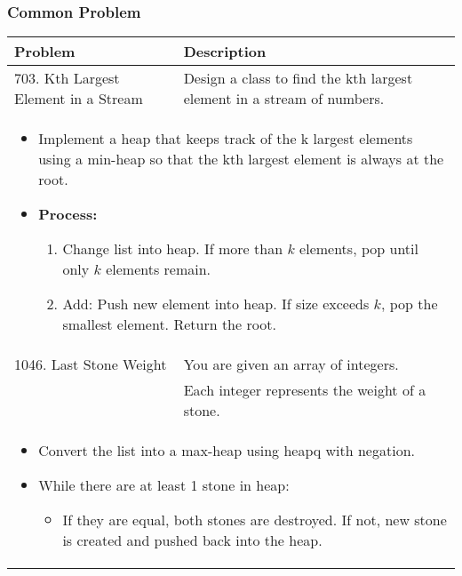 \subsubsection{Common Problem}
\begin{summary}
    \begin{center}
        \begin{tabular}{ll}
            \toprule
            \textbf{Problem} & \textbf{Description} \\
            \midrule
            703. Kth Largest Element in a Stream & Design a class to find the kth largest element in a stream of numbers. \\
            \multicolumn{2}{p{\linewidth}}{
                    \begin{itemize}
                        \item Implement a heap that keeps track of the k largest elements using a min-heap so that the kth largest element is always at the root. 
                        \item \textbf{Process:}
                        \begin{enumerate}
                            \item Change list into heap. If more than $k$ elements, pop until only $k$ elements remain.
                            \item Add: Push new element into heap. If size exceeds $k$, pop the smallest element. Return the root.
                        \end{enumerate}
                    \end{itemize}
                } \\
            \midrule
            1046. Last Stone Weight & You are given an array of integers. \\
            & Each integer represents the weight of a stone. \\
            \multicolumn{2}{p{\linewidth}}{
                    \begin{itemize}
                        \item Convert the list into a max-heap using heapq with negation. 
                        \item While there are at least 1 stone in heap:
                        \begin{itemize}
                            \item If they are equal, both stones are destroyed. If not, new stone is created and pushed back into the heap.
                        \end{itemize}

\end{itemize}}
\end{tabular}
\end{center}
\end{summary}
